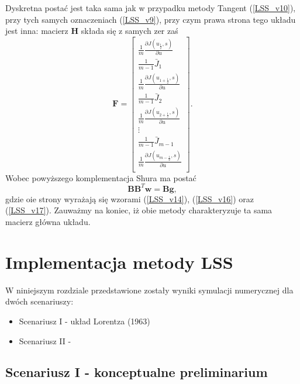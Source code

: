\documentclass[12pt]{article}
\begin{document}
Dyskretna postać jest taka sama jak w przypadku metody Tangent (\ref{LSS_v10}), przy tych samych oznaczeniach (\ref{LSS_v9}), przy czym prawa strona tego układu jest inna: macierz $ \textbf{H} $ składa się z samych zer zaś
\begin{equation}
\textbf{F} = \begin{bmatrix}
\frac{1}{m}\frac{\partial J(u_{\frac{1}{2}},s)}{\partial u} \\
\frac{1}{m-1}\bar{J}_{1} \\
\frac{1}{m}\frac{\partial J(u_{1+\frac{1}{2}},s)}{\partial u}\\
\frac{1}{m-1}\bar{J}_{2} \\
\frac{1}{m}\frac{\partial J(u_{2+\frac{1}{2}},s)}{\partial u}\\
\vdots \\
\frac{1}{m-1}\bar{J}_{m-1} \\
\frac{1}{m}\frac{\partial J(u_{m-\frac{1}{2}},s)}{\partial u}\\
\end{bmatrix}.
\label{LSS_v23}
\end{equation}
Wobec powyższego komplementacja Shura ma postać 
\begin{equation}
\textbf{B}\textbf{B}^{T}\textbf{w} = \textbf{B}\textbf{g}
\label{LSS_v24},
\end{equation}
gdzie oie strony wyrażają się wzorami (\ref{LSS_v14}), (\ref{LSS_v16}) oraz (\ref{LSS_v17}). \newline
Zauważmy na koniec, iż obie metody charakteryzuje ta sama macierz główna układu.
\newpage
\section{Implementacja metody LSS}
W niniejszym rozdziale przedstawione zostały wyniki symulacji numerycznej dla dwóch scenariuszy:
\begin{itemize}
	\item Scenariusz I - układ Lorentza (1963)
	\item Scenariusz II - 
\end{itemize}
\subsection{Scenariusz I - konceptualne preliminarium}
\end{document}
